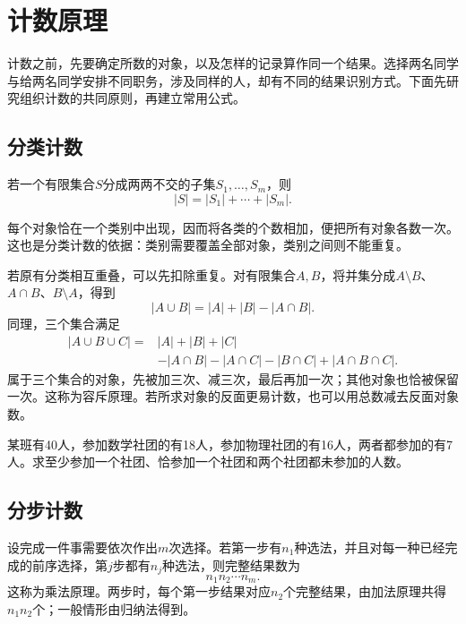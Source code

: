 \FloatBarrier
\newpage
\section{计数原理}
\label{sec:prob-counting}

计数之前，先要确定所数的对象，以及怎样的记录算作同一个结果。选择两名同学与给两名同学安排不同职务，涉及同样的人，却有不同的结果识别方式。下面先研究组织计数的共同原则，再建立常用公式。

\subsection{分类计数}

\begin{proposition}[加法原理]
若一个有限集合\(S\)分成两两不交的子集\(S_1,\ldots,S_m\)，则
\[
 |S|=|S_1|+\cdots+|S_m|.
\]
\end{proposition}

每个对象恰在一个类别中出现，因而将各类的个数相加，便把所有对象各数一次。这也是分类计数的依据：类别需要覆盖全部对象，类别之间则不能重复。

若原有分类相互重叠，可以先扣除重复。对有限集合\(A,B\)，将并集分成\(A\setminus B\)、\(A\cap B\)、\(B\setminus A\)，得到
\begin{equation}\label{eq:prob-counting-inclusion}
 |A\cup B|=|A|+|B|-|A\cap B|.
\end{equation}
同理，三个集合满足
\begin{align*}
 |A\cup B\cup C|={}&|A|+|B|+|C|\\
 &-|A\cap B|-|A\cap C|-|B\cap C|+|A\cap B\cap C|.
\end{align*}
属于三个集合的对象，先被加三次、减三次，最后再加一次；其他对象也恰被保留一次。这称为{\heiti 容斥原理}。若所求对象的反面更易计数，也可以用总数减去反面对象数。

\begin{example}
某班有40人，参加数学社团的有18人，参加物理社团的有16人，两者都参加的有7人。求至少参加一个社团、恰参加一个社团和两个社团都未参加的人数。
\end{example}

\subsection{分步计数}

设完成一件事需要依次作出\(m\)次选择。若第一步有\(n_1\)种选法，并且对每一种已经完成的前序选择，第\(j\)步都有\(n_j\)种选法，则完整结果数为
\begin{equation}\label{eq:prob-counting-product}
 n_1n_2\cdots n_m.
\end{equation}
这称为{\heiti 乘法原理}。两步时，每个第一步结果对应\(n_2\)个完整结果，由加法原理共得\(n_1n_2\)个；一般情形由归纳法得到。

